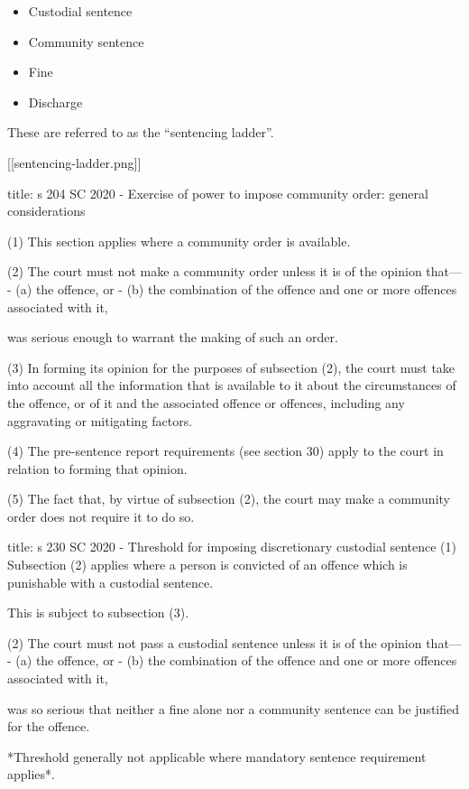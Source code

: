 \documentclass[
]{article}
\newenvironment{Shaded}{}{}
\newcommand{\NormalTok}[1]{#1}
\providecommand{\tightlist}{%
  \setlength{\itemsep}{0pt}\setlength{\parskip}{0pt}}
\begin{document}
\begin{itemize}
\tightlist
\item
  Custodial sentence
\item
  Community sentence
\item
  Fine
\item
  Discharge
\end{itemize}

These are referred to as the ``sentencing ladder''.

{[}{[}sentencing-ladder.png{]}{]}

\begin{Shaded}
\begin{Highlighting}[]
\NormalTok{title: s 204 SC 2020 {-} Exercise of power to impose community order: general considerations}

\NormalTok{(1) This section applies where a community order is available.}

\NormalTok{(2) The court must not make a community order unless it is of the opinion that—}
\NormalTok{{-} (a) the offence, or}
\NormalTok{{-} (b) the combination of the offence and one or more offences associated with it,}

\NormalTok{was serious enough to warrant the making of such an order.}

\NormalTok{(3) In forming its opinion for the purposes of subsection (2), the court must take into account all the information that is available to it about the circumstances of the offence, or of it and the associated offence or offences, including any aggravating or mitigating factors.}

\NormalTok{(4) The pre{-}sentence report requirements (see section 30) apply to the court in relation to forming that opinion.}

\NormalTok{(5) The fact that, by virtue of subsection (2), the court may make a community order does not require it to do so.}
\end{Highlighting}
\end{Shaded}

\begin{Shaded}
\begin{Highlighting}[]
\NormalTok{title: s 230 SC 2020 {-} Threshold for imposing discretionary custodial sentence}
\NormalTok{(1) Subsection (2) applies where a person is convicted of an offence which is punishable with a custodial sentence.}

\NormalTok{This is subject to subsection (3).}

\NormalTok{(2) The court must not pass a custodial sentence unless it is of the opinion that—}
\NormalTok{{-} (a) the offence, or}
\NormalTok{{-} (b) the combination of the offence and one or more offences associated with it,}

\NormalTok{was so serious that neither a fine alone nor a community sentence can be justified for the offence.}

\NormalTok{*Threshold generally not applicable where mandatory sentence requirement applies*.}
\end{Highlighting}
\end{Shaded}
\end{document}
